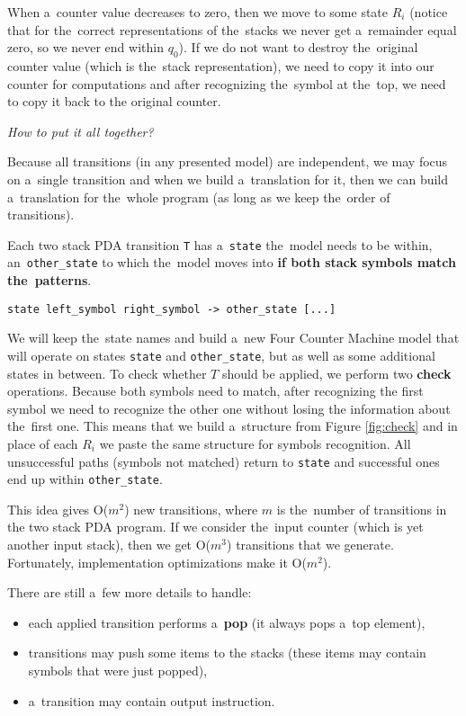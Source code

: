 \documentclass[english,shortabstract,mgr]{iithesis}
\begin{document}
When a~counter value decreases to zero, then we move to some state $R_i$ (notice that for
the~correct representations of the~stacks we never get a~remainder equal zero, so we never end within $q_0$).
If we do not want to destroy the~original counter value (which is the~stack representation), we need
to copy it into our counter for computations and after recognizing the~symbol at the~top,
we need to copy it back to the original counter.

\textit{How to put it all together?}

Because all transitions (in any presented model) are independent, we may focus on a~single
transition and when we build a~translation for it, then we can build a~translation for the~whole
program (as long as we keep the~order of transitions).

Each two stack PDA transition \texttt{T} has a~\texttt{state} the~model needs to be within,
an~\texttt{other\_state} to which the~model moves into \textbf{if both stack symbols match
the~patterns}.

\begin{verbatim}
state left_symbol right_symbol -> other_state [...]
\end{verbatim}

We will keep the~state names and build a~new Four Counter Machine model that will operate
on states \texttt{state} and \texttt{other\_state}, but as well as some additional states
in between. To check whether $T$ should be applied, we perform two \textbf{check}
operations. Because both symbols need to match, after recognizing the first symbol
we need to recognize the other one without losing the information about the~first one. This
means that we build a~structure from Figure \ref{fig:check} and in place of each $R_i$ we
paste the same structure for symbols recognition. All unsuccessful paths (symbols not matched)
return to \texttt{state} and successful ones end up within \texttt{other\_state}.

This idea gives O($m^2$) new transitions, where $m$ is the~number of transitions in the two stack PDA
program. If we consider the~input counter (which is yet another input stack), then we get O($m^3$)
transitions that we generate. Fortunately, implementation optimizations make it O($m^2$).

There are still a~few more details to handle:
\begin{itemize}
  \item each applied transition performs a~\textbf{pop} (it always pops a~top element),
  \item transitions may push some items to the stacks (these items may contain symbols that
      were just popped),
  \item a~transition may contain output instruction.
\end{itemize}
\end{document}
